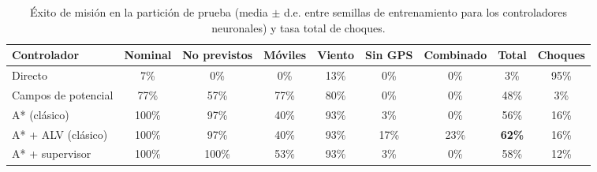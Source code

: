 \begin{table}[t]
\centering
\caption{Éxito de misión en la partición de prueba (media $\pm$ d.e. entre semillas de entrenamiento para los controladores neuronales) y tasa total de choques.}
\label{tab:principal}
\begin{tabular}{lcccccccc}
\toprule
Controlador & Nominal & No previstos & Móviles & Viento & Sin GPS & Combinado & Total & Choques \\
\midrule
Directo & 7\% & 0\% & 0\% & 13\% & 0\% & 0\% & 3\% & 95\% \\
Campos de potencial & 77\% & 57\% & 77\% & 80\% & 0\% & 0\% & 48\% & 3\% \\
A* (clásico) & 100\% & 97\% & 40\% & 93\% & 3\% & 0\% & 56\% & 16\% \\
A* + ALV (clásico) & 100\% & 97\% & 40\% & 93\% & 17\% & 23\% & \textbf{62\%} & 16\% \\
A* + supervisor & 100\% & 100\% & 53\% & 93\% & 3\% & 0\% & 58\% & 12\% \\
\bottomrule
\end{tabular}
\end{table}
